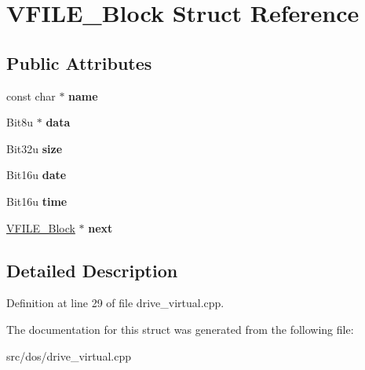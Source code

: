 \hypertarget{structVFILE__Block}{\section{V\-F\-I\-L\-E\-\_\-\-Block Struct Reference}
\label{structVFILE__Block}
}
\subsection*{Public Attributes}
\begin{DoxyCompactItemize}
\item 
\hypertarget{structVFILE__Block_aa3a1a3b8db84962a6d2d7d284fb72ff6}{const char $\ast$ {\bfseries name}}\label{structVFILE__Block_aa3a1a3b8db84962a6d2d7d284fb72ff6}

\item 
\hypertarget{structVFILE__Block_aa6f72136b271fa17b0ec1877ad722921}{Bit8u $\ast$ {\bfseries data}}\label{structVFILE__Block_aa6f72136b271fa17b0ec1877ad722921}

\item 
\hypertarget{structVFILE__Block_a754dce82621341bcf36deba925ff0297}{Bit32u {\bfseries size}}\label{structVFILE__Block_a754dce82621341bcf36deba925ff0297}

\item 
\hypertarget{structVFILE__Block_ad865066cfbe7f8192ced881edbd1fc83}{Bit16u {\bfseries date}}\label{structVFILE__Block_ad865066cfbe7f8192ced881edbd1fc83}

\item 
\hypertarget{structVFILE__Block_adbdd82b26937b970cace6d89e327cb40}{Bit16u {\bfseries time}}\label{structVFILE__Block_adbdd82b26937b970cace6d89e327cb40}

\item 
\hypertarget{structVFILE__Block_a9b503da2b5dd066df75aadc4794b201e}{\hyperlink{structVFILE__Block}{V\-F\-I\-L\-E\-\_\-\-Block} $\ast$ {\bfseries next}}\label{structVFILE__Block_a9b503da2b5dd066df75aadc4794b201e}

\end{DoxyCompactItemize}


\subsection{Detailed Description}


Definition at line 29 of file drive\-\_\-virtual.\-cpp.



The documentation for this struct was generated from the following file\-:\begin{DoxyCompactItemize}
\item 
src/dos/drive\-\_\-virtual.\-cpp\end{DoxyCompactItemize}
